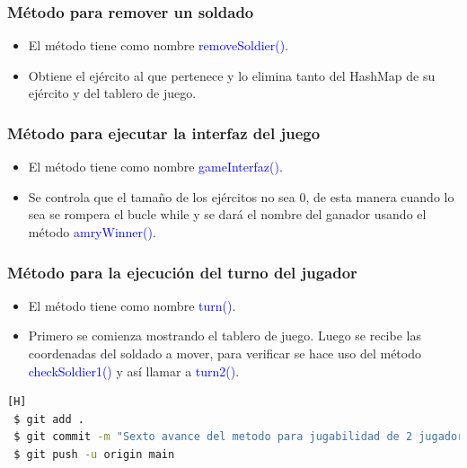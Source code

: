 \documentclass{article}
\begin{document}
\subsubsection{Método para remover un soldado}
\begin{itemize}
    \item El método tiene como nombre \textcolor{blue}{removeSoldier()}.
    \item Obtiene el ejército al que pertenece y lo elimina tanto del HashMap de su ejército y del tablero de juego.
\end{itemize}



\subsubsection{Método para ejecutar la interfaz del juego}
\begin{itemize}
    \item El método tiene como nombre \textcolor{blue}{gameInterfaz()}.
    \item Se controla que el tamaño de los ejércitos no sea 0, de esta manera cuando lo sea se rompera el bucle while y se dará el nombre del ganador usando el método \textcolor{blue}{amryWinner()}.
\end{itemize}



\subsubsection{Método para la ejecución del turno del jugador}
\begin{itemize}
    \item El método tiene como nombre \textcolor{blue}{turn()}.
    \item Primero se comienza mostrando el tablero de juego. Luego se recibe las coordenadas del soldado a mover, para verificar se hace uso del método \textcolor{blue}{checkSoldier1()} y así llamar a \textcolor{blue}{turn2()}.
\end{itemize}


\begin{lstlisting}[language=bash,caption={Commit \href{https://github.com/hernanchoquehuanca/fp2-23b/commit/d8d54ce00cb19dbff9dc2f96c170e64cc9e1114a}{d8d54ce}: Se agregó los métodos para la jugabilidad de 2 (hasta lab10)}][H]
 $ git add .
 $ git commit -m "Sexto avance del metodo para jugabilidad de 2 jugadores, concluido hasta el lab10"	
 $ git push -u origin main
\end{lstlisting}
\end{document}
